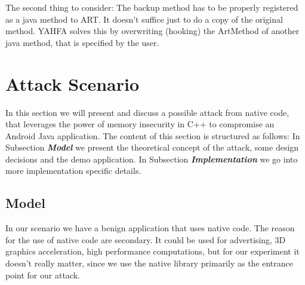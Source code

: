 The second thing to consider: The backup method has to be properly registered as a java method to ART. It doesn't suffice just to do a copy of the original method. YAHFA solves this by overwriting (hooking) the ArtMethod of another java method, that is specified by the user.


\section{Attack Scenario}
In this section we will present and discuss a possible attack from native code, that leverages the power of memory insecurity in C++ to compromise an Android Java application. The content of this section is structured as follows: In Subsection \emph{\textbf{Model}} we present the theoretical concept of the attack, some design decisions and the demo application. 
In Subsection \emph{\textbf{Implementation}} we go into more implementation specific details. %

\subsection{Model}

In our scenario we have a benign application that uses native code.
The reason for the use of native code are secondary. It could be used for advertising, 3D graphics acceleration, high performance computations, but for our experiment it doesn't really matter, since we use the native library primarily as the entrance point for our attack.

